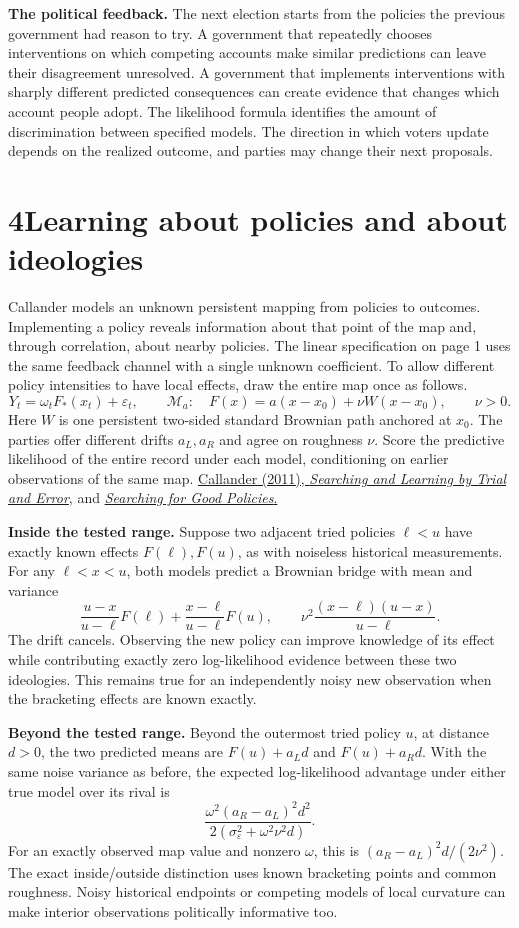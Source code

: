 \documentclass[11pt,letterpaper]{article}
\newcommand{\sect}[1]{\section*{\color{ink}#1}}
\newcommand{\lead}[1]{\textbf{#1}\enspace}
\newcommand{\src}[2]{\href{#1}{#2}}
\begin{document}
\lead{The political feedback.} The next election starts from the policies the previous government had reason to try. A government that repeatedly chooses interventions on which competing accounts make similar predictions can leave their disagreement unresolved. A government that implements interventions with sharply different predicted consequences can create evidence that changes which account people adopt. The likelihood formula identifies the amount of discrimination between specified models. The direction in which voters update depends on the realized outcome, and parties may change their next proposals.

\newpage
\sect{4\quad Learning about policies and about ideologies}
Callander models an unknown persistent mapping from policies to outcomes. Implementing a policy reveals information about that point of the map and, through correlation, about nearby policies. The linear specification on page 1 uses the same feedback channel with a single unknown coefficient. To allow different policy intensities to have local effects, draw the entire map once as follows.
\[
 Y_t=\omega_t F_*(x_t)+\varepsilon_t,\qquad
 \mathcal M_a:\quad F(x)=a(x-x_0)+\nu W(x-x_0),\qquad \nu>0.
\]
Here $W$ is one persistent two-sided standard Brownian path anchored at $x_0$. The parties offer different drifts $a_L,a_R$ and agree on roughness $\nu$. Score the predictive likelihood of the entire record under each model, conditioning on earlier observations of the same map. \src{https://doi.org/10.1257/aer.101.6.2277}{Callander (2011), \emph{Searching and Learning by Trial and Error}}, and \src{https://doi.org/10.1017/S0003055411000426}{\emph{Searching for Good Policies}.}

\lead{Inside the tested range.} Suppose two adjacent tried policies $\ell<u$ have exactly known effects $F(\ell),F(u)$, as with noiseless historical measurements. For any $\ell<x<u$, both models predict a Brownian bridge with mean and variance
\[
 \frac{u-x}{u-\ell}F(\ell)+\frac{x-\ell}{u-\ell}F(u),\qquad
 \nu^2\frac{(x-\ell)(u-x)}{u-\ell}.
\]
The drift cancels. Observing the new policy can improve knowledge of its effect while contributing exactly zero log-likelihood evidence between these two ideologies. This remains true for an independently noisy new observation when the bracketing effects are known exactly.

\lead{Beyond the tested range.} Beyond the outermost tried policy $u$, at distance $d>0$, the two predicted means are $F(u)+a_Ld$ and $F(u)+a_Rd$. With the same noise variance as before, the expected log-likelihood advantage under either true model over its rival is
\[
 \frac{\omega^2(a_R-a_L)^2 d^2}{2(\sigma_\varepsilon^2+\omega^2\nu^2d)}.
\]
For an exactly observed map value and nonzero $\omega$, this is $(a_R-a_L)^2d/(2\nu^2)$. The exact inside/outside distinction uses known bracketing points and common roughness. Noisy historical endpoints or competing models of local curvature can make interior observations politically informative too.
\end{document}
